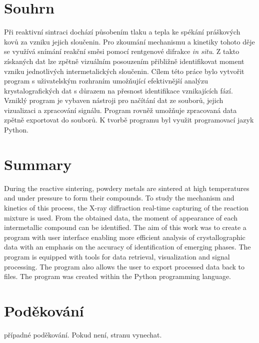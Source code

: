 \documentclass[a4paper, 12pt]{article}
\begin{document}
\section*{Souhrn}
Při reaktivní sintraci dochází působením tlaku a tepla ke spékání práškových kovů za vzniku jejich sloučenin. Pro zkoumání mechanismu a kinetiky tohoto děje se využívá snímání reakční směsi pomocí rentgenové difrakce \textit{in situ}. Z takto získaných dat lze zpětně vizuálním posouzením přibližně identifikovat  moment vzniku jednotlivých intermetalických sloučenin. Cílem této práce bylo vytvořit program s uživatelským rozhraním umožňující efektivnější analýzu krystalografických dat s důrazem na přesnost identifikace vznikajících fází. Vzniklý program je vybaven nástroji pro načítání dat ze souborů, jejich vizualizaci a zpracování signálu. Program rovněž umožňuje zpracovaná data zpětně exportovat do souborů. K tvorbě programu byl využit programovací jazyk Python.

\section*{Summary}
During the reactive sintering, powdery metals are sintered at high temperatures and under pressure to form their compounds. To study the mechanism and kinetics of this process, the X-ray diffraction real-time capturing of the reaction mixture is used. From the obtained data, the moment of appearance of each intermetallic compound can be identified. The aim of this work was to create a program with user interface enabling more efficient analysis of crystallographic data with an emphasis on the accuracy of identification of emerging phases. The program is equipped with tools for data retrieval, visualization and signal processing. The program also allows the user to export processed data back to files. The program was created within the Python programming language.
\newpage

\section*{Poděkování}
případné poděkování. Pokud není, stranu vynechat.

\newpage

\tableofcontents
\newpage

\end{document}
